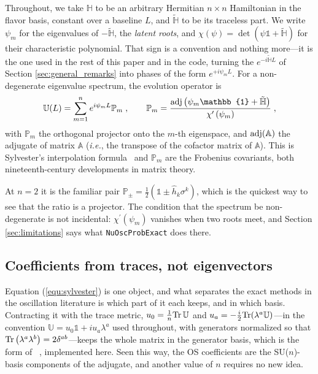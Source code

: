 \documentclass[final,5p,times,twocolumn,sort,compress]{elsarticle}
\newcommand{\ie}{{\it i.e.}}
\providecommand{\Ref}{}
\begin{document}
Throughout, we take $\mathbb{H}$ to be an arbitrary Hermitian $n \times n$ Hamiltonian in the flavor basis, constant over a baseline $L$, and $\tilde{\mathbb{H}}$ to be its traceless part.  We write $\psi_m$ for the eigenvalues of $-\tilde{\mathbb{H}}$, the \emph{latent roots}, and $\chi(\psi) = \det(\psi \mathbb{1} + \tilde{\mathbb{H}})$ for their characteristic polynomial.  That sign is a convention and nothing more---it is the one used in the rest of this paper and in the code, turning the $e^{-i \tilde{\mathbb{H}} L}$ of Section \ref{sec:general_remarks} into phases of the form $e^{+i \psi_m L}$.  For a non-degenerate eigenvalue spectrum, the evolution operator is
\begin{equation}
 \label{equ:sylvester}
 \mathbb{U}(L)
 =
 \sum_{m=1}^n e^{i\psi_m L} \mathbb{P}_m \;,
 \qquad
 \mathbb{P}_m
 =
 \frac{{\rm adj}\left(\psi_m \mathbb{1} + \tilde{\mathbb{H}}\right)}{\chi^\prime\left(\psi_m\right)} \;,
\end{equation}
with $\mathbb{P}_m$ the orthogonal projector onto the $m$-th eigenspace, and ${\rm adj}(\mathbb{A})$ the adjugate of matrix $\mathbb{A}$ (\ie, the transpose of the cofactor matrix of $\mathbb{A}$).  This is Sylvester's interpolation formula\ \cite{Sylvester:1883} and $\mathbb{P}_m$ are the Frobenius covariants, both nineteenth-century developments in matrix theory.

At $n = 2$ it is the familiar pair $\mathbb{P}_\pm = \frac{1}{2}\left(\mathbb{1} \pm \hat{h}_k \sigma^k\right)$, which is the quickest way to see that the ratio is a projector.  The condition that the spectrum be non-degenerate is not incidental: $\chi^\prime(\psi_m)$ vanishes when two roots meet, and Section \ref{sec:limitations} says what {\tt NuOscProbExact} does there.


\subsection{Coefficients from traces, not eigenvectors}
\label{sec:readings}

Equation (\ref{equ:sylvester}) is one object, and what separates the exact methods in the oscillation literature is which part of it each keeps, and in which basis.  Contracting it with the trace metric, $u_0 = \frac{1}{n}{\rm Tr}\,\mathbb{U}$ and $u_a = -\frac{i}{2}{\rm Tr}(\lambda^a \mathbb{U})$---in the convention $\mathbb{U} = u_0 \mathbb{1} + i u_a \lambda^a$ used throughout, with generators normalized so that ${\rm Tr}\left(\lambda^a \lambda^b\right) = 2\delta^{ab}$---keeps the whole matrix in the generator basis, which is the form of \Ref\ \cite{Merfeld:2014cha}, implemented here.  Seen this way, the OS coefficients are the SU($n$)-basis components of the adjugate, and another value of $n$ requires no new idea.
\end{document}
